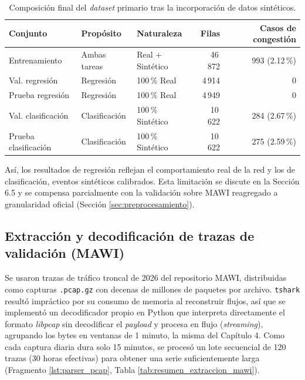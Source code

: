 \documentclass[12pt]{report}
\begin{document}
\begin{table}[H]
    \centering
    \begin{tabular}{|l|l|l|r|r|}
        \hline
        \textbf{Conjunto} & \textbf{Propósito} & \textbf{Naturaleza} & \textbf{Filas} & \textbf{Casos de congestión} \\
        \hline
        Entrenamiento & Ambas tareas & Real + Sintético & 46\,872 & 993 (2.12\,\%) \\
        Val. regresión & Regresión & 100\,\% Real & 4\,914 & 0 \\
        Prueba regresión & Regresión & 100\,\% Real & 4\,949 & 0 \\
        Val. clasificación & Clasificación & 100\,\% Sintético & 10\,622 & 284 (2.67\,\%) \\
        Prueba clasificación & Clasificación & 100\,\% Sintético & 10\,622 & 275 (2.59\,\%) \\
        \hline
    \end{tabular}
    \caption{Composición final del \textit{dataset} primario tras la incorporación de datos sintéticos.}
    \label{tab:composicion_dataset_final}
\end{table}

Así, los resultados de regresión reflejan el comportamiento real de la red y los de clasificación, eventos sintéticos calibrados. Esta limitación se discute en la Sección 6.5 y se compensa parcialmente con la validación sobre MAWI reagregado a granularidad oficial (Sección \ref{sec:preprocesamiento}).

\subsection*{Extracción y decodificación de trazas de validación (MAWI)}

Se usaron trazas de tráfico troncal de 2026 del repositorio MAWI, distribuidas como capturas \texttt{.pcap.gz} con decenas de millones de paquetes por archivo. \texttt{tshark} resultó impráctico por su consumo de memoria al reconstruir flujos, así que se implementó un decodificador propio en Python que interpreta directamente el formato \textit{libpcap} sin decodificar el \textit{payload} y procesa en flujo (\textit{streaming}), agrupando los bytes en ventanas de 1 minuto, la misma del Capítulo 4. Como cada captura diaria dura solo 15 minutos, se procesó un lote secuencial de 120 trazas (30 horas efectivas) para obtener una serie suficientemente larga (Fragmento \ref{lst:parser_pcap}, Tabla \ref{tab:resumen_extraccion_mawi}).
\end{document}
